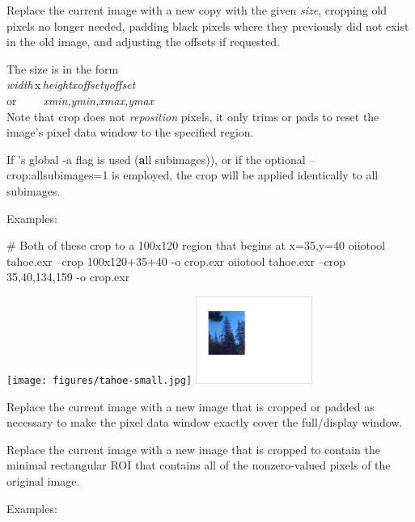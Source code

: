 Replace the current image with a new copy with the given \emph{size},
cropping old pixels no longer needed, padding black pixels where they
previously did not exist in the old image, and adjusting the offsets
if requested.

The size is in the form 
\\ \spc\spc \emph{width}\,{\cf x}\,\emph{height}{\cf [+-]}\emph{xoffset}{\cf
  [+-]}\emph{yoffset}
\\ or~~~~ \spc \emph{xmin,ymin,xmax,ymax} \\


Note that {\cf crop} does not \emph{reposition} pixels, it only trims or
pads to reset the image's pixel data window to the specified region.

If \oiiotool's global {\cf -a} flag is used ({\bf a}ll subimages)), or if the
optional {\cf --crop:allsubimages=1} is employed, the crop will be applied
identically to all subimages.

\noindent Examples:

\begin{code}
    # Both of these crop to a 100x120 region that begins at x=35,y=40
    oiiotool tahoe.exr --crop 100x120+35+40 -o crop.exr
    oiiotool tahoe.exr --crop 35,40,134,159 -o crop.exr
\end{code}

\hspace{0.4in} \texttt{[image: figures/tahoe-small.jpg]}
\raisebox{40pt}{\large $\rightarrow$}
 \includegraphics[width=1.5in]{figures/crop.jpg}
\apiend

Replace the current image with a new image that is cropped or padded
as necessary to make the pixel data window exactly cover
the full/display window.
\apiend

Replace the current image with a new image that is cropped to contain the
minimal rectangular ROI that contains all of the nonzero-valued pixels of
the original image.

\noindent Examples:

